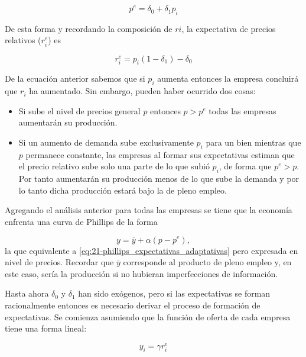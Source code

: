 \documentclass[DeGregorioResumen]{subfiles}
\begin{document}
\begin{equation}
	p^e= \delta_0+\delta_1p_i %
	\label{eq:21-precio_esperado}
\end{equation}

De esta forma y recordando la composición de $ri$, la expectativa de precios relativos ($r^e_i$) es

\begin{equation}
	r^e_i = p_i(1-\delta_1)-\delta_0
\end{equation}

De la ecuación anterior sabemos que si $p_i$ aumenta entonces la empresa concluirá que $r_i$ ha aumentado. Sin embargo, pueden haber ocurrido dos cosas:

\begin{itemize}
	\item Si sube el nivel de precios general $p$ entonces $p>p^e$ todas las empresas aumentarán su producción.
	\item Si un aumento de demanda sube exclusivamente $p_i$ para un bien mientras 	que $p$ permanece constante, las empresas al formar sus expectativas estiman que el precio relativo sube solo una parte de lo que subió $p_i$, de forma que $p^e>p$. Por tanto aumentarán su producción menos de lo que sube la demanda y por lo tanto dicha producción estará bajo la de pleno empleo.
\end{itemize}

Agregando el análisis anterior para todas las empresas se tiene que la economía enfrenta una curva de Phillips de la forma

\begin{equation}
	y=\overline y + \alpha (p-p^e),
	\label{eq:21-phillips_lucas}
\end{equation}
la que equivalente a \eqref{eq:21-phillips_expectativas_adaptativas} pero expresada en nivel de precios. Recordar que $\overline y$ corresponde al producto de pleno empleo y, en este caso, sería la producción si no hubieran imperfecciones de información.

\hrulefill

Hasta ahora $\delta_0$ y $\delta_1$ han sido exógenos, pero si las expectativas se forman racionalmente entonces es necesario derivar el proceso de formación de expectativas. Se comienza asumiendo que la función de oferta de cada empresa tiene una forma lineal:

\begin{equation*}
	y_i=\gamma r^e_i
\end{equation*}
\end{document}
